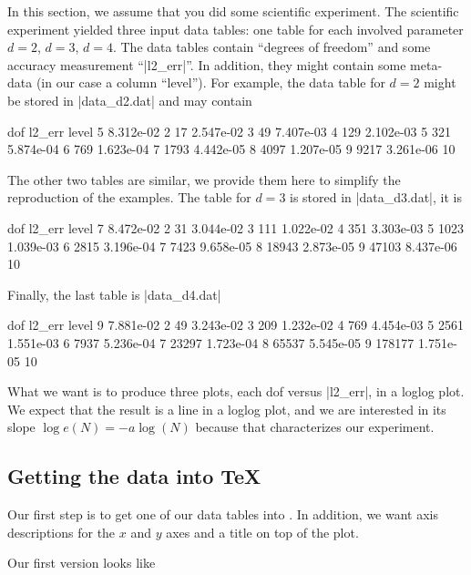 In this section, we assume that you did some scientific experiment. The scientific experiment yielded three input data tables: one table for each involved parameter $d=2$, $d=3$, $d=4$. The data tables contain ``degrees of freedom'' and some accuracy measurement ``|l2_err|''. In addition, they might contain some meta-data (in our case a column ``level''). For example, the data table for $d=2$ might be stored in |data_d2.dat| and may contain
\begin{codeexample}
dof        l2_err     level
5          8.312e-02  2
17         2.547e-02  3
49         7.407e-03  4
129        2.102e-03  5
321        5.874e-04  6
769        1.623e-04  7
1793       4.442e-05  8
4097       1.207e-05  9
9217       3.261e-06  10
\end{codeexample}
The other two tables are similar, we provide them here to simplify the reproduction of the examples. The table for $d=3$ is stored in |data_d3.dat|, it is
\begin{codeexample}
dof        l2_err     level
7          8.472e-02  2
31         3.044e-02  3
111        1.022e-02  4
351        3.303e-03  5
1023       1.039e-03  6
2815       3.196e-04  7
7423       9.658e-05  8
18943      2.873e-05  9
47103      8.437e-06  10
\end{codeexample}
Finally, the last table is |data_d4.dat|
\begin{codeexample}
dof        l2_err     level
9          7.881e-02  2
49         3.243e-02  3
209        1.232e-02  4
769        4.454e-03  5
2561       1.551e-03  6
7937       5.236e-04  7
23297      1.723e-04  8
65537      5.545e-05  9
178177     1.751e-05  10
\end{codeexample}

What we want is to produce three plots, each dof versus |l2_err|, in a loglog plot. We expect that the result is a line in a loglog plot, and we are interested in its slope $\log e(N) = -a \log(N)$ because that characterizes our experiment.

\subsection{Getting the data into TeX}
\label{sec:tut2:step1}

Our first step is to get one of our data tables into \PGFPlots. In addition, we want axis descriptions for the $x$ and $y$ axes and a title on top of the plot.

Our first version looks like
\begin{codeexample}[]

%


%
\end{codeexample}

